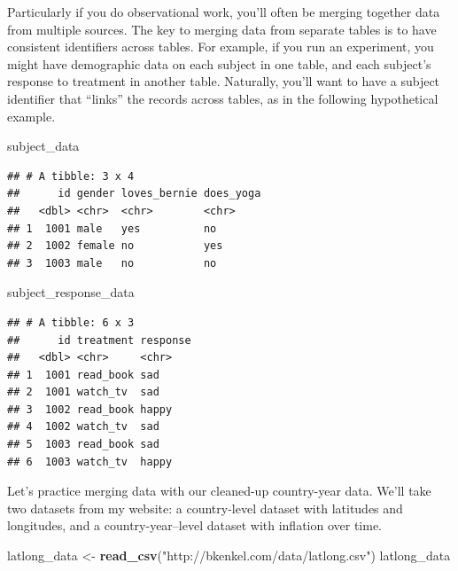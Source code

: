 \documentclass[12pt,oneside,openany]{book}
\newenvironment{Shaded}{\begin{snugshade}}{\end{snugshade}}
\newcommand{\KeywordTok}[1]{\textcolor[rgb]{0.13,0.29,0.53}{\textbf{#1}}}
\newcommand{\StringTok}[1]{\textcolor[rgb]{0.31,0.60,0.02}{#1}}
\newcommand{\NormalTok}[1]{#1}
\begin{document}
Particularly if you do observational work, you'll often be merging
together data from multiple sources. The key to merging data from
separate tables is to have consistent identifiers across tables. For
example, if you run an experiment, you might have demographic data on
each subject in one table, and each subject's response to treatment in
another table. Naturally, you'll want to have a subject identifier that
``links'' the records across tables, as in the following hypothetical
example.

\begin{Shaded}
\begin{Highlighting}[]
\NormalTok{subject_data}
\end{Highlighting}
\end{Shaded}

\begin{verbatim}
## # A tibble: 3 x 4
##      id gender loves_bernie does_yoga
##   <dbl> <chr>  <chr>        <chr>    
## 1  1001 male   yes          no       
## 2  1002 female no           yes      
## 3  1003 male   no           no
\end{verbatim}

\begin{Shaded}
\begin{Highlighting}[]
\NormalTok{subject_response_data}
\end{Highlighting}
\end{Shaded}

\begin{verbatim}
## # A tibble: 6 x 3
##      id treatment response
##   <dbl> <chr>     <chr>   
## 1  1001 read_book sad     
## 2  1001 watch_tv  sad     
## 3  1002 read_book happy   
## 4  1002 watch_tv  sad     
## 5  1003 read_book sad     
## 6  1003 watch_tv  happy
\end{verbatim}

Let's practice merging data with our cleaned-up country-year data. We'll
take two datasets from my website: a country-level dataset with
latitudes and longitudes, and a country-year--level dataset with
inflation over time.

\begin{Shaded}
\begin{Highlighting}[]
\NormalTok{latlong_data <-}\StringTok{ }\KeywordTok{read_csv}\NormalTok{(}\StringTok{"http://bkenkel.com/data/latlong.csv"}\NormalTok{)}
\NormalTok{latlong_data}
\end{Highlighting}
\end{Shaded}
\end{document}
